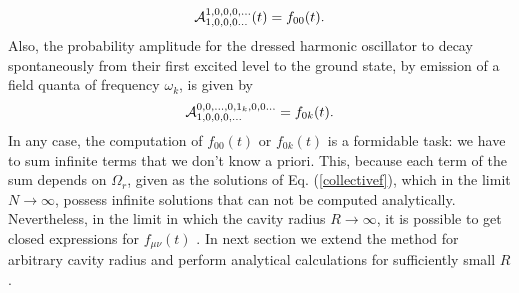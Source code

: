 \documentclass[10pt,english,twocolumn]{revtex4}
\begin{document}
%
\begin{equation}
{\cal A}_{1,0,0,0...}^{1,0,0,0,...}(t)=f_{00}(t).
\label{ampltude}
\end{equation}
%
Also,  the probability amplitude for the dressed harmonic oscillator to decay spontaneously from their first excited
level to the ground state, by emission of a field quanta of frequency $\omega_k$, is given by
%
\begin{equation}
{\cal A}_{1,0,0,0,...}^{0,0,...,0,1_k,0,0...}=f_{0k}(t).
\label{decay}
\end{equation}
%
In any case, the computation of $f_{00}(t)$ or $f_{0k}(t)$ is a formidable task: we have to sum infinite terms that we don't know
a priori. This, because each term of the sum depends on $\Omega_r$, given as the solutions of Eq. (\ref{collectivef}), which in the limit
$N\to\infty$,  possess infinite solutions that can not be computed analytically. Nevertheless, in the limit in which
the cavity radius $R\to\infty$,  it is possible to get closed expressions for $f_{\mu\nu}(t)$ \cite{gabrielsolo}. In next section
we extend the method for arbitrary cavity radius and perform analytical calculations for sufficiently small $R$.

\end{document}
